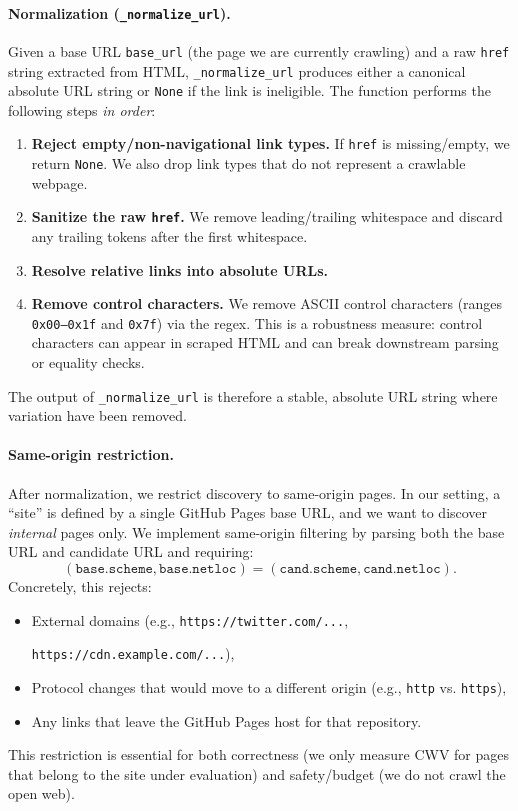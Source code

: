 \paragraph{Normalization (\texttt{\_normalize\_url}).}
Given a base URL \texttt{base\_url} (the page we are currently crawling) and a raw \texttt{href} string extracted from HTML, \texttt{\_normalize\_url} produces either a canonical absolute URL string or \texttt{None} if the link is ineligible. The function performs the following steps \emph{in order}:

\begin{enumerate}
    \item \textbf{Reject empty/non-navigational link types.}
    If \texttt{href} is missing/empty, we return \texttt{None}.
    We also drop link types that do not represent a crawlable webpage.

    \item \textbf{Sanitize the raw \texttt{href}.}
    We remove leading/trailing whitespace and discard any trailing tokens after the first whitespace.

    \item \textbf{Resolve relative links into absolute URLs.}

    \item \textbf{Remove control characters.}
    We remove ASCII control characters (ranges \texttt{0x00--0x1f} and \texttt{0x7f}) via the regex. This is a robustness measure: control characters can appear in scraped HTML and can break downstream parsing or equality checks.

\end{enumerate}

\noindent The output of \texttt{\_normalize\_url} is therefore a stable, absolute URL string where variation have been removed.

\paragraph{Same-origin restriction.}
After normalization, we restrict discovery to same-origin pages. In our setting, a ``site'' is defined by a single GitHub Pages base URL, and we want to discover \emph{internal} pages only. We implement same-origin filtering by parsing both the base URL and candidate URL and requiring:
\[
(\texttt{base.scheme}, \texttt{base.netloc}) = (\texttt{cand.scheme}, \texttt{cand.netloc}).
\]
 Concretely, this rejects:
\begin{itemize}
    \item External domains (e.g., \texttt{https://twitter.com/...}, 
    
    \texttt{https://cdn.example.com/...}),
    \item Protocol changes that would move to a different origin (e.g., \texttt{http} vs. \texttt{https}),
    \item Any links that leave the GitHub Pages host for that repository.
\end{itemize}
This restriction is essential for both correctness (we only measure CWV for pages that belong to the site under evaluation) and safety/budget (we do not crawl the open web).

